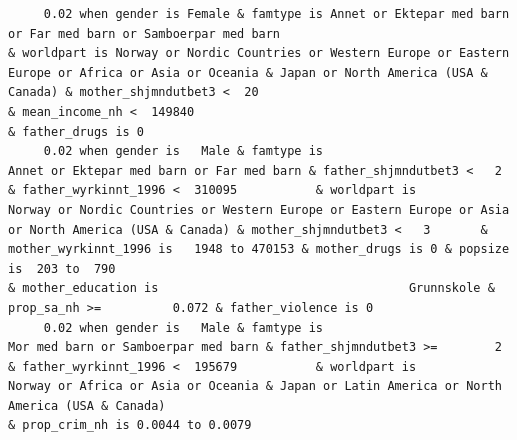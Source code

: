 \documentclass[
  letterpaper,
  DIV=11,
  numbers=noendperiod]{scrreprt}
\begin{document}
\begin{verbatim}
     0.02 when gender is Female & famtype is Annet or Ektepar med barn or Far med barn or Samboerpar med barn                                                                              & worldpart is Norway or Nordic Countries or Western Europe or Eastern Europe or Africa or Asia or Oceania & Japan or North America (USA & Canada) & mother_shjmndutbet3 <  20                                                                                                                              & mean_income_nh <  149840                                                                                                                                                                                                                                        & father_drugs is 0                                                                                           
     0.02 when gender is   Male & famtype is                        Annet or Ektepar med barn or Far med barn & father_shjmndutbet3 <   2       & father_wyrkinnt_1996 <  310095           & worldpart is                              Norway or Nordic Countries or Western Europe or Eastern Europe or Asia or North America (USA & Canada) & mother_shjmndutbet3 <   3       & mother_wyrkinnt_1996 is   1948 to 470153 & mother_drugs is 0 & popsize is  203 to  790                                                                                                                                                                        & mother_education is                                   Grunnskole & prop_sa_nh >=          0.072 & father_violence is 0                                                                                                               
     0.02 when gender is   Male & famtype is                              Mor med barn or Samboerpar med barn & father_shjmndutbet3 >=        2 & father_wyrkinnt_1996 <  195679           & worldpart is                                        Norway or Africa or Asia or Oceania & Japan or Latin America or North America (USA & Canada)                                                                                                                                                                                                                            & prop_crim_nh is 0.0044 to 0.0079                                                                                                                                                                                                                                                                            

\end{verbatim}
\end{document}
